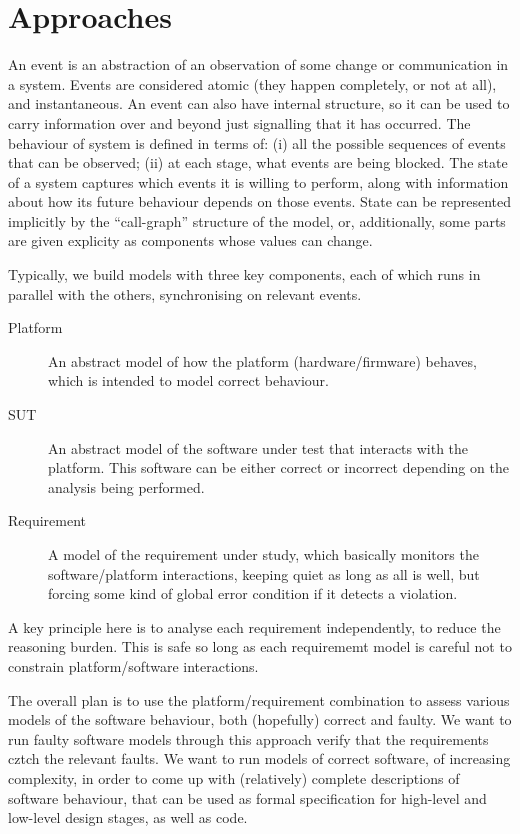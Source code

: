 \section{Approaches}

An event is an abstraction of an observation of some change
or communication in a system. Events are considered atomic
(they happen completely, or not at all), and instantaneous.
An event can also have internal structure,
so it can be used to carry information over and beyond
just signalling that it has occurred.
The behaviour of system is defined in terms of:
(i) all the possible sequences of events that can be observed;
(ii) at each stage, what events are being blocked.
The state of a system captures which events it is willing to perform,
along with information about how its future behaviour depends on those events.
State can be represented implicitly by the ``call-graph'' structure of the model,
or, additionally,
some parts are given explicity as components whose values can change.

Typically, we build models with three key components,
each of which runs in parallel with the others,
synchronising on relevant events.
\begin{description}
  \item [Platform]
    An abstract model of how the platform (hardware/firmware) behaves,
    which is intended to model correct behaviour.
  \item [SUT]
   An abstract model of the software under test that interacts
   with the platform.
   This software can be either correct or incorrect depending on
   the analysis being performed.
  \item [Requirement]
   A model of the requirement under study, which basically monitors
   the software/platform interactions, keeping quiet as long as all is well,
   but forcing some kind of global error condition if it detects a violation.
\end{description}
A key principle here is to analyse each requirement independently,
to reduce the reasoning burden.
This is safe so long as each requirememt model is careful not
to constrain platform/software interactions.

The overall plan is to use the platform/requirement combination
to assess various models of the software behaviour,
both (hopefully) correct and faulty.
We want to run faulty software models through this approach verify that
the requirements cztch the relevant faults.
We want to run models of correct software, of increasing complexity,
in order to come up with (relatively) complete descriptions
of software behaviour, that can be used as formal specification
for high-level and low-level design stages, as well as code.


